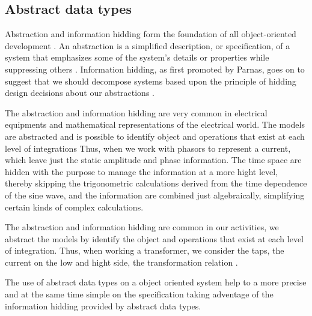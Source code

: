 \subsection{Abstract data types}

Abstraction and information hidding form 
the foundation of all object-oriented 
development \cite{Levy:1984}. 
An abstraction is a simplified description, 
or specification, of a system that emphasizes 
some of the system's details or properties while
suppressing others \cite{Shaw:1984}.
Information hidding, as first promoted by Parnas,
goes on to suggest that we should decompose 
systems based upon the principle of hidding 
design decisions about our 
abstractions \cite{Parnas:1979} \cite{Grady:1995}.

The abstraction and information hidding 
are very common in electrical equipments and 
mathematical representations of the 
electrical world. The 
models are abstracted 
and is possible to identify object and 
operations that exist at each level of integrations 
Thus, 
when  we work 
with phasors to represent a current, which 
leave just the static amplitude and phase
information. The time space are hidden with 
the purpose to manage the information 
at a more hight level, 
thereby skipping the trigonometric calculations 
derived from the time dependence of the sine wave, 
and the information are combined just algebraically, 
simplifying certain kinds of complex 
calculations.  \cite{Grady:1995}

The abstraction  and information hidding are common 
in our activities, we abstract the models by 
identify the object and operations that exist 
at each level of integration. Thus, when
\cite[inline]{ver si las palabras estan 
bien escritas en este ejemplo} 
working a transformer, we consider the 
taps, the current on the low and hight side, 
the transformation relation \cite{Grady:1995}.

The use of abstract data types on a object oriented system 
help to a more precise and at the same time simple on the 
specification taking adventage of the information hidding 
provided by abstract 
data types. \cite{} 




